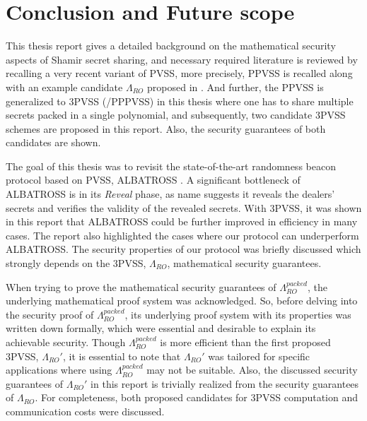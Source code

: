 \chapter{Conclusion and Future scope}
\label{cha:conclusion}
This thesis report gives a detailed background on the mathematical security aspects of 
Shamir secret sharing, and necessary required literature is reviewed by recalling a 
very recent variant of PVSS, more precisely, PPVSS is recalled along with an example 
candidate $\Lambda_{RO}$ proposed in \cite{cryptoeprint:2025/576}. And further, the PPVSS is generalized 
to 3PVSS (/PPPVSS) in this thesis where one has to share multiple 
secrets packed in a single polynomial, and subsequently, two candidate 3PVSS schemes 
are proposed in this report. Also, the security guarantees of both candidates are shown.\par

The goal of this thesis was to revisit the state-of-the-art randomness beacon protocol 
based on PVSS, ALBATROSS \cite{cryptoeprint:2020/644}. A significant bottleneck of 
ALBATROSS is in its \textit{Reveal} phase, as name suggests it reveals the dealers' secrets 
and verifies the validity of the revealed secrets. With 3PVSS, it was shown in this 
report that ALBATROSS could be further improved in efficiency in many cases. The report 
also highlighted the cases where our protocol can underperform ALBATROSS. The security 
properties of our protocol was briefly discussed which strongly depends on the 3PVSS, 
$\Lambda_{RO}$, mathematical security guarantees.\par

When trying to prove the mathematical security guarantees of $\Lambda_{RO}^{packed}$,  
the underlying mathematical proof system was acknowledged. So, before delving into the 
security proof of $\Lambda_{RO}^{packed}$, its underlying proof system with its properties 
was written down formally, which were essential and desirable to explain its 
achievable security. Though $\Lambda_{RO}^{packed}$ is more efficient than the first 
proposed 3PVSS, $\Lambda_{RO}'$, it is essential to note that $\Lambda_{RO}'$ was tailored 
for specific applications where using $\Lambda_{RO}^{packed}$ may not be suitable. Also, 
the discussed security guarantees of $\Lambda_{RO}'$ in this report is trivially 
realized from the security guarantees of $\Lambda_{RO}$. For completeness, both proposed candidates 
for 3PVSS computation and communication costs were discussed.\par

